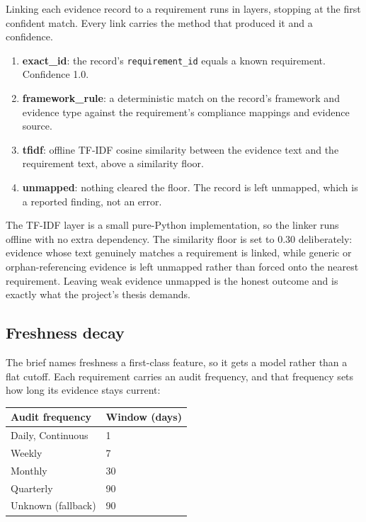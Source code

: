 \documentclass[11pt]{article}
\newcommand{\code}[1]{\texttt{\small #1}}
\begin{document}
Linking each evidence record to a requirement runs in layers, stopping at the first
confident match. Every link carries the method that produced it and a confidence.

\begin{enumerate}[leftmargin=1.4em,itemsep=2pt]
\item \textbf{exact\_id}: the record's \code{requirement\_id} equals a known requirement.
  Confidence 1.0.
\item \textbf{framework\_rule}: a deterministic match on the record's framework and
  evidence type against the requirement's compliance mappings and evidence source.
\item \textbf{tfidf}: offline TF-IDF cosine similarity between the evidence text and the
  requirement text, above a similarity floor.
\item \textbf{unmapped}: nothing cleared the floor. The record is left unmapped, which is
  a reported finding, not an error.
\end{enumerate}

The TF-IDF layer is a small pure-Python implementation, so the linker runs offline with
no extra dependency. The similarity floor is set to 0.30 deliberately: evidence whose
text genuinely matches a requirement is linked, while generic or orphan-referencing
evidence is left unmapped rather than forced onto the nearest requirement. Leaving weak
evidence unmapped is the honest outcome and is exactly what the project's thesis demands.

\subsection{Freshness decay}\label{sec:freshness}

The brief names freshness a first-class feature, so it gets a model rather than a flat
cutoff. Each requirement carries an audit frequency, and that frequency sets how long its
evidence stays current:

\begin{center}
\sffamily\small
\begin{tabular}{@{}ll@{}}
\toprule
Audit frequency & Window (days) \\
\midrule
Daily, Continuous & 1 \\
Weekly & 7 \\
Monthly & 30 \\
Quarterly & 90 \\
Unknown (fallback) & 90 \\
\bottomrule
\end{tabular}
\end{center}
\end{document}
